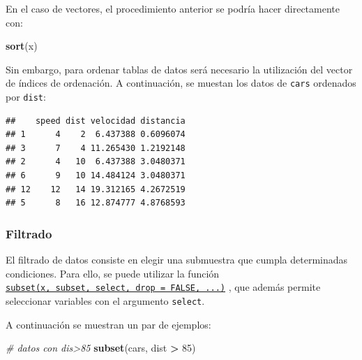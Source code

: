 \documentclass[
]{book}
\newenvironment{Shaded}{\begin{snugshade}}{\end{snugshade}}
\newcommand{\CommentTok}[1]{\textcolor[rgb]{0.56,0.35,0.01}{\textit{#1}}}
\newcommand{\DecValTok}[1]{\textcolor[rgb]{0.00,0.00,0.81}{#1}}
\newcommand{\FunctionTok}[1]{\textcolor[rgb]{0.13,0.29,0.53}{\textbf{#1}}}
\newcommand{\NormalTok}[1]{#1}
\newcommand{\OtherTok}[1]{\textcolor[rgb]{0.56,0.35,0.01}{#1}}
\newcommand{\SpecialCharTok}[1]{\textcolor[rgb]{0.81,0.36,0.00}{\textbf{#1}}}
\begin{document}
En el caso de vectores, el procedimiento anterior se podría
hacer directamente con:

\begin{Shaded}
\begin{Highlighting}[]
\FunctionTok{sort}\NormalTok{(x)}
\end{Highlighting}
\end{Shaded}

Sin embargo, para ordenar tablas de datos será necesario la utilización del
vector de índices de ordenación. A continuación, se muestan los datos de \texttt{cars} ordenados por \texttt{dist}:

\begin{Shaded}
\end{Shaded}

\begin{verbatim}
##    speed dist velocidad distancia
## 1      4    2  6.437388 0.6096074
## 3      7    4 11.265430 1.2192148
## 2      4   10  6.437388 3.0480371
## 6      9   10 14.484124 3.0480371
## 12    12   14 19.312165 4.2672519
## 5      8   16 12.874777 4.8768593
\end{verbatim}

\hypertarget{filtrado}{%
\subsubsection{Filtrado}\label{filtrado}}

El filtrado de datos consiste en elegir una submuestra que cumpla determinadas condiciones. Para ello, se puede utilizar la función \href{https://www.rdocumentation.org/packages/base/versions/3.6.1/topics/subset}{\texttt{subset(x,\ subset,\ select,\ drop\ =\ FALSE,\ ...)}} , que además permite seleccionar variables con el argumento \texttt{select}.

A continuación se muestran un par de ejemplos:

\begin{Shaded}
\begin{Highlighting}[]
\CommentTok{\# datos con dis\textgreater{}85}
\FunctionTok{subset}\NormalTok{(cars, dist }\SpecialCharTok{\textgreater{}} \DecValTok{85}\NormalTok{) }
\end{Highlighting}
\end{Shaded}
\end{document}
